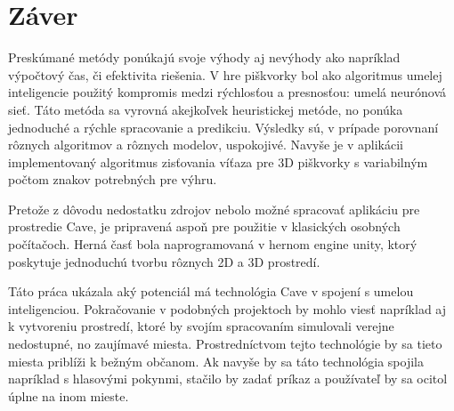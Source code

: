\section*{Záver}

Preskúmané metódy ponúkajú svoje výhody aj nevýhody ako napríklad výpočtový čas, či efektivita riešenia.
V hre piškvorky bol ako algoritmus umelej inteligencie použitý kompromis medzi rýchlosťou a presnosťou: umelá neurónová
sieť.
Táto metóda sa vyrovná akejkoľvek heuristickej metóde, no ponúka jednoduché a rýchle spracovanie a predikciu.
Výsledky sú, v prípade porovnaní rôznych algoritmov a rôznych modelov, uspokojivé.
Navyše je v aplikácii implementovaný algoritmus zisťovania víťaza pre 3D piškvorky s variabilným počtom znakov
potrebných pre výhru.

Pretože z dôvodu nedostatku zdrojov nebolo možné spracovať aplikáciu pre prostredie Cave, je pripravená aspoň pre
použitie v klasických osobných počítačoch.
Herná časť bola naprogramovaná v hernom engine unity, ktorý poskytuje jednoduchú tvorbu rôznych 2D a 3D prostredí.

Táto práca ukázala aký potenciál má technológia Cave v spojení s umelou inteligenciou.
Pokračovanie v podobných projektoch by mohlo viesť napríklad aj k vytvoreniu prostredí, ktoré by svojím spracovaním
simulovali verejne nedostupné, no zaujímavé miesta.
Prostredníctvom tejto technológie by sa tieto miesta priblíži k bežným občanom.
Ak navyše by sa táto technológia spojila napríklad s hlasovými pokynmi, stačilo by zadať príkaz a používateľ by sa
ocitol úplne na inom mieste.

